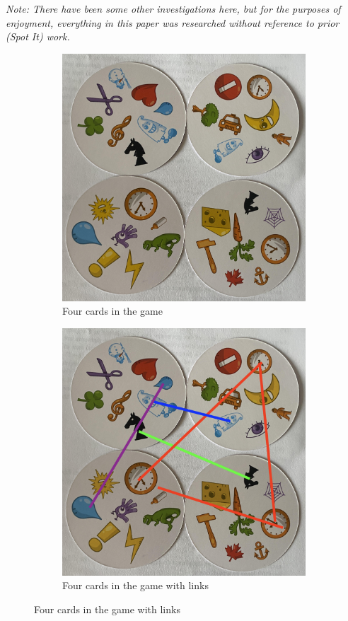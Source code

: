 \documentclass[11pt, oneside]{article} 	%
\begin{document}
\emph{Note: There have been some other investigations here\cite{2}, but for the purposes of enjoyment, everything in this paper was researched without reference to prior (Spot It) work.}


\begin{figure}[!htb]
\centering
\begin{subfigure}{.2\textwidth}
 \centering
\includegraphics[scale=.2]{cards}
\caption{Four cards in the game}
\label{fig:cards}
\end{subfigure}

\begin{subfigure}{.2\textwidth}
 \centering
\includegraphics[scale=.2]{cards-links}
\caption{Four cards in the game with links}
\label{fig:cards-links}
\end{subfigure}


\end{figure}
\end{document}
